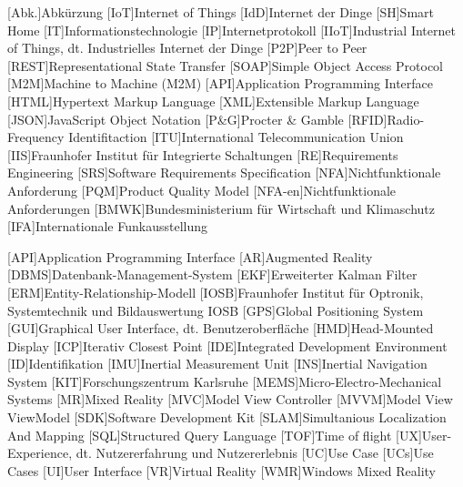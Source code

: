 \begin{acronym}[DHBW]
 [Abk.]{Abkürzung}
 [IoT]{Internet of Things}
 [IdD]{Internet der Dinge}
 [SH]{Smart Home}
 [IT]{Informationstechnologie}
 [IP]{Internetprotokoll}
 [IIoT]{Industrial Internet of Things, dt. Industrielles Internet der Dinge}
 [P2P]{Peer to Peer} 
 [REST]{Representational State Transfer}
 [SOAP]{Simple Object Access Protocol}
 [M2M]{Machine to Machine (M2M)}
 [API]{Application Programming Interface}
 [HTML]{Hypertext Markup Language}
 [XML]{Extensible Markup Language}
 [JSON]{JavaScript Object Notation}
 [P\&G]{Procter \& Gamble}
 [RFID]{Radio-Frequency Identifitaction}
 [ITU]{International Telecommunication Union}
 [IIS]{Fraunhofer Institut für Integrierte Schaltungen}
 [RE]{Requirements Engineering}
 [SRS]{Software Requirements Specification}
 [NFA]{Nichtfunktionale Anforderung}
 [PQM]{Product Quality Model}
 [NFA-en]{Nichtfunktionale Anforderungen}
 [BMWK]{Bundesministerium für Wirtschaft und Klimaschutz}
 [IFA]{Internationale Funkausstellung}


 [API]{Application Programming Interface}
 [AR]{Augmented Reality}
 [DBMS]{Datenbank-Management-System}
 [EKF]{Erweiterter Kalman Filter}
 [ERM]{Entity-Relationship-Modell}
 [IOSB]{Fraunhofer Institut für Optronik, Systemtechnik und Bildauswertung IOSB}
 [GPS]{Global Positioning System}
 [GUI]{Graphical User Interface, dt. Benutzeroberfläche}
 [HMD]{Head-Mounted Display}
 [ICP]{Iterativ Closest Point}
 [IDE]{Integrated Development Environment}
 [ID]{Identifikation}
 [IMU]{Inertial Measurement Unit}
 [INS]{Inertial Navigation System}
 [KIT]{Forschungszentrum Karlsruhe}
 [MEMS]{Micro-Electro-Mechanical Systems}
 [MR]{Mixed Reality}
 [MVC]{Model View Controller}
 [MVVM]{Model View ViewModel}
 [SDK]{Software Development Kit}
 [SLAM]{Simultanious Localization And Mapping}
 [SQL]{Structured Query Language}
 [TOF]{Time of flight}
 [UX]{User-Experience, dt. Nutzererfahrung und Nutzererlebnis}
 [UC]{Use Case}
 [UCs]{Use Cases}
 [UI]{User Interface}
 [VR]{Virtual Reality}
 [WMR]{Windows Mixed Reality}


\end{acronym}
